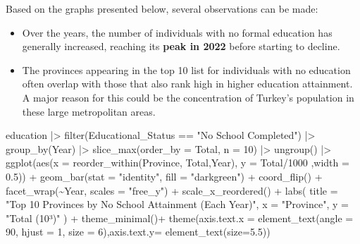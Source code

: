 \documentclass[
  11pt,
  a4paper,
  DIV=11,
  numbers=noendperiod]{scrartcl}
\newenvironment{Shaded}{\begin{snugshade}}{\end{snugshade}}
\newcommand{\AttributeTok}[1]{\textcolor[rgb]{0.40,0.45,0.13}{#1}}
\newcommand{\DecValTok}[1]{\textcolor[rgb]{0.68,0.00,0.00}{#1}}
\newcommand{\FloatTok}[1]{\textcolor[rgb]{0.68,0.00,0.00}{#1}}
\newcommand{\FunctionTok}[1]{\textcolor[rgb]{0.28,0.35,0.67}{#1}}
\newcommand{\NormalTok}[1]{\textcolor[rgb]{0.00,0.23,0.31}{#1}}
\newcommand{\SpecialCharTok}[1]{\textcolor[rgb]{0.37,0.37,0.37}{#1}}
\newcommand{\StringTok}[1]{\textcolor[rgb]{0.13,0.47,0.30}{#1}}
\begin{document}
Based on the graphs presented below, several observations can be made:

\begin{itemize}
\item
  Over the years, the number of individuals with no formal education has
  generally increased, reaching its {\textbf{peak in 2022}} before
  starting to decline.
\item
  The provinces appearing in the top 10 list for individuals with no
  education often overlap with those that also rank high in higher
  education attainment. A major reason for this could be the
  concentration of Turkey's population in these large metropolitan
  areas.
\end{itemize}

\begin{Shaded}
\begin{Highlighting}[]
\NormalTok{education }\SpecialCharTok{|\textgreater{}} 
  \FunctionTok{filter}\NormalTok{(Educational\_Status }\SpecialCharTok{==} \StringTok{"No School Completed"}\NormalTok{) }\SpecialCharTok{|\textgreater{}} 
  \FunctionTok{group\_by}\NormalTok{(Year) }\SpecialCharTok{|\textgreater{}} 
  \FunctionTok{slice\_max}\NormalTok{(}\AttributeTok{order\_by =}\NormalTok{ Total, }\AttributeTok{n =} \DecValTok{10}\NormalTok{) }\SpecialCharTok{|\textgreater{}} 
  \FunctionTok{ungroup}\NormalTok{() }\SpecialCharTok{|\textgreater{}} 
  \FunctionTok{ggplot}\NormalTok{(}\FunctionTok{aes}\NormalTok{(}\AttributeTok{x =} \FunctionTok{reorder\_within}\NormalTok{(Province, Total,Year), }\AttributeTok{y =}\NormalTok{ Total}\SpecialCharTok{/}\DecValTok{1000}\NormalTok{ ,}\AttributeTok{width =} \FloatTok{0.5}\NormalTok{)) }\SpecialCharTok{+}
  \FunctionTok{geom\_bar}\NormalTok{(}\AttributeTok{stat =} \StringTok{"identity"}\NormalTok{, }\AttributeTok{fill =} \StringTok{"darkgreen"}\NormalTok{) }\SpecialCharTok{+}
  \FunctionTok{coord\_flip}\NormalTok{() }\SpecialCharTok{+} 
  \FunctionTok{facet\_wrap}\NormalTok{(}\SpecialCharTok{\textasciitilde{}}\NormalTok{Year, }\AttributeTok{scales =} \StringTok{"free\_y"}\NormalTok{) }\SpecialCharTok{+}
  \FunctionTok{scale\_x\_reordered}\NormalTok{() }\SpecialCharTok{+}
  \FunctionTok{labs}\NormalTok{(}
    \AttributeTok{title =} \StringTok{"Top 10 Provinces by No School Attainment (Each Year)"}\NormalTok{,}
    \AttributeTok{x =} \StringTok{"Province"}\NormalTok{,}
    \AttributeTok{y =} \StringTok{"Total (10³)"}
\NormalTok{  ) }\SpecialCharTok{+}
  \FunctionTok{theme\_minimal}\NormalTok{()}\SpecialCharTok{+}
  \FunctionTok{theme}\NormalTok{(}\AttributeTok{axis.text.x =} \FunctionTok{element\_text}\NormalTok{(}\AttributeTok{angle =} \DecValTok{90}\NormalTok{, }\AttributeTok{hjust =} \DecValTok{1}\NormalTok{, }\AttributeTok{size =} \DecValTok{6}\NormalTok{),}\AttributeTok{axis.text.y=} \FunctionTok{element\_text}\NormalTok{(}\AttributeTok{size=}\FloatTok{5.5}\NormalTok{))}
\end{Highlighting}
\end{Shaded}
\end{document}
